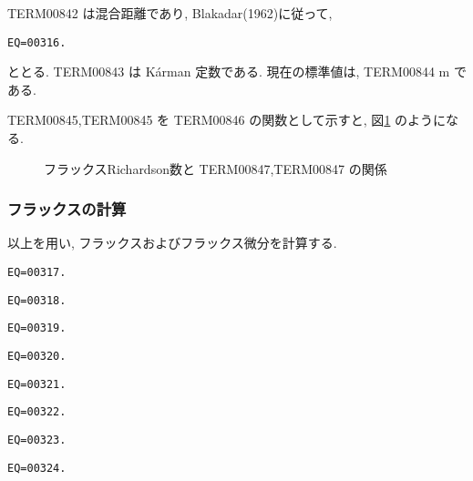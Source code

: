 TERM00842 は混合距離であり, Blakadar(1962)に従って,
\begin{verbatim}
EQ=00316.
\end{verbatim}
ととる. 
TERM00843 は K\'{a}rman 定数である. 
%
% 
現在の標準値は, TERM00844 m である.

TERM00845,TERM00845 を TERM00846 の関数として示すと,
図\ref{p-dif:smsh-rif} のようになる.

\begin{figure}[htbp]
  \begin{center}
    \caption{フラックスRichardson数と TERM00847,TERM00847 の関係}
    \label{p-dif:smsh-rif}
  \end{center}
\end{figure}


\subsubsection{フラックスの計算}

以上を用い, フラックスおよびフラックス微分を計算する.

\begin{verbatim}
EQ=00317.
\end{verbatim}
\begin{verbatim}
EQ=00318.
\end{verbatim}
\begin{verbatim}
EQ=00319.
\end{verbatim}
\begin{verbatim}
EQ=00320.
\end{verbatim}

\begin{verbatim}
EQ=00321.
\end{verbatim}
\begin{verbatim}
EQ=00322.
\end{verbatim}
\begin{verbatim}
EQ=00323.
\end{verbatim}
\begin{verbatim}
EQ=00324.
\end{verbatim}

